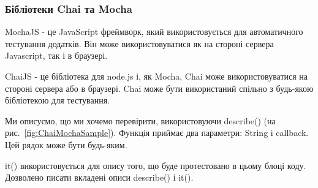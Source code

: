 \subsubsection{Бібліотеки Chai та Mocha}


MochaJS - це JavaScript фреймворк, який використовується для автоматичного тестування додатків. Він може використовуватися як на стороні сервера Javascript, так і в браузері. 

ChaiJS - це бібліотека для node.js і, як Mocha, Chai може використовуватися на стороні сервера або в браузері. Chai може бути використаний спільно з будь-якою бібліотекою для тестування.

Ми описуємо, що ми хочемо перевірити, використовуючи describe() (на рис.~\ref{fig:ChaiMochaSample}). Функція приймає два параметри: String і callback. Цей рядок може бути будь-яким.

it() використовується для опису того, що буде протестовано в цьому блоці коду. Дозволено писати вкладені описи describe() і it().


